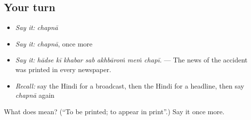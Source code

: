 \subsection*{Your turn}
\begin{itemize}
\raggedright
  \item \emph{Say it:} \emph{chapnā}
  \item \emph{Say it:} \emph{chapnā}, once more
  \item \emph{Say it:} \emph{hādse kī khabar sab akhbāroṁ meṁ chapī.} — The news of the accident was printed in every newspaper.
  \item \emph{Recall:} say the Hindi for a broadcast, then the Hindi for a headline, then say \emph{chapnā} again
\end{itemize}

\begin{tcolorbox}[breakable,colback=teal!4,colframe=teal!35!black,title={Before you move on}]
What does  mean? (\textquotedblleft{}To be printed; to appear in print\textquotedblright{}.) Say it once more.
\end{tcolorbox}
